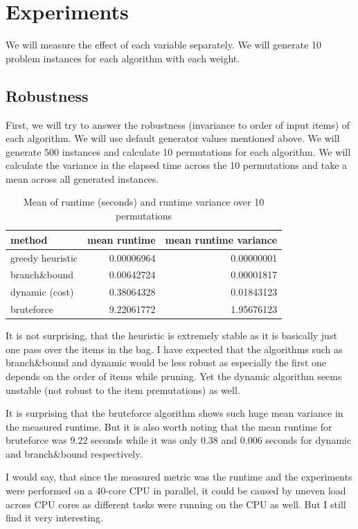 \documentclass[a4paper,10pt]{article}
\begin{document}
\clearpage

\section{Experiments}
We will measure the effect of each variable separately. We will generate 10 problem instances for each algorithm with each weight.

\subsection{Robustness}
First, we will try to answer the robustness (invariance to order of input items) of each algorithm. We will use default generator values mentioned above. We will generate 500 instances and calculate 10 permutations for each algorithm. We will calculate the variance in the elapsed time across the 10 permutations and take a mean across all generated instances.

\begin{table}[!htb]
\centering
\begin{tabular}{lrr}
method & mean runtime & mean runtime variance\\
\midrule
greedy heuristic & 0.00006964 & 0.00000001 \\
branch\&bound & 0.00642724 & 0.00001817 \\
dynamic (cost) & 0.38064328 & 0.01843123 \\
bruteforce   & 9.22061772 & 1.95676123 \\
\bottomrule
\end{tabular}
\caption{Mean of runtime (seconds) and runtime variance over 10 permutations}
\end{table}

It is not surprising, that the heuristic is extremely stable as it is basically just one pass over the items in the bag. I have expected that the algorithms such as branch\&bound and dynamic would be less robust as especially the first one depends on the order of items while pruning. Yet the dynamic algorithm seems unstable (not robust to the item premutations) as well.

It is surprising that the bruteforce algorithm shows such huge mean variance in the measured runtime. But it is also worth noting that the mean runtime for bruteforce was $9.22$ seconds while it was only $0.38$ and $0.006$ seconds for dynamic and branch\&bound respectively.

I would say, that since the measured metric was the runtime and the experiments were performed on a 40-core CPU in parallel, it could be caused by uneven load across CPU cores as different tasks were running on the CPU as well. But I still find it very interesting.
\end{document}

